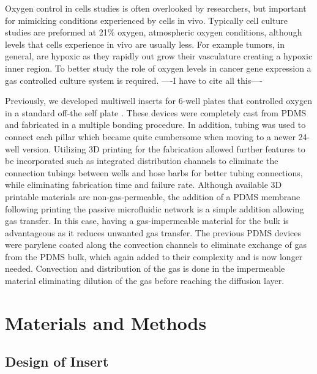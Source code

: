 Oxygen control in cells studies is often overlooked by researchers, but important for mimicking conditions experienced by cells in vivo.
Typically cell culture studies are preformed at 21\% oxygen, atmospheric oxygen conditions, although levels that cells experience in vivo are usually less.
For example tumors, in general, are hypoxic as they rapidly out grow their vasculature creating a hypoxic inner region. 
To better study the role of oxygen levels in cancer gene expression a gas controlled culture system is required. ----I have to cite all this----

Previously, we developed multiwell inserts for 6-well plates that controlled oxygen in a standard off-the self plate \cite{Oppegard2009, Oppegard2010}.
These devices were completely cast from PDMS and fabricated in a multiple bonding procedure.
In addition, tubing was used to connect each pillar which became quite cumbersome when moving to a newer 24-well version.
Utilizing 3D printing for the fabrication allowed further features to be incorporated such as integrated distribution channels to eliminate the connection tubings between wells and hose barbs for better tubing connections, while eliminating fabrication time and failure rate.
Although available 3D printable materials are non-gas-permeable, the addition of a PDMS membrane following printing the passive microfluidic network is a simple addition allowing gas transfer. 
In this case, having a gas-impermeable material for the bulk is advantageous as it reduces unwanted gas transfer. 
The previous PDMS devices were parylene coated along the convection channels to eliminate exchange of gas from the PDMS bulk, which again added to their complexity and is now longer needed.
Convection and distribution of the gas is done in the impermeable material eliminating dilution of the gas before reaching the diffusion layer. 

\section*{Materials and Methods}


\subsection*{Design of Insert}

